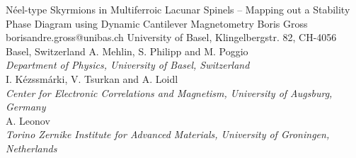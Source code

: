 \begin{conf-abstract}[]
{Néel-type Skyrmions in Multiferroic Lacunar Spinels – Mapping out a Stability Phase Diagram using Dynamic Cantilever Magnetometry}
{\color{blue} Boris Gross}
{borisandre.gross@unibas.ch}
{University of Basel, Klingelbergstr. 82, CH-4056 Basel, Switzerland}
{{\color{blue}A. Mehlin, S. Philipp and M. Poggio}\\ \textit{Department of Physics, University of Basel, Switzerland}\\ 
{\color{blue}I. Kézssmárki, V. Tsurkan and A. Loidl}\\ \textit{ Center for Electronic Correlations and Magnetism, University of Augsburg, Germany}\\ 
{\color{blue}A. Leonov}\\ \textit{Torino Zernike Institute for Advanced Materials, University of Groningen, Netherlands}\\ 
\decofourleft \decofourright}





\printbibliography[heading=none]

\end{conf-abstract}
